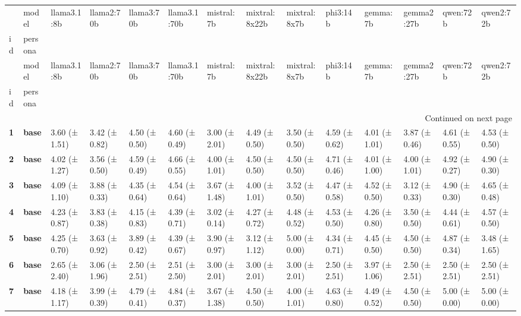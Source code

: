 \begin{longtable}{llllllllllllll}
\toprule
 & model & llama3.1:8b & llama2:70b & llama3:70b & llama3.1:70b & mistral:7b & mixtral:8x22b & mixtral:8x7b & phi3:14b & gemma:7b & gemma2:27b & qwen:72b & qwen2:72b \\
id & persona &  &  &  &  &  &  &  &  &  &  &  &  \\
\midrule
\endfirsthead
\toprule
 & model & llama3.1:8b & llama2:70b & llama3:70b & llama3.1:70b & mistral:7b & mixtral:8x22b & mixtral:8x7b & phi3:14b & gemma:7b & gemma2:27b & qwen:72b & qwen2:72b \\
id & persona &  &  &  &  &  &  &  &  &  &  &  &  \\
\midrule
\endhead
\midrule
\multicolumn{14}{r}{Continued on next page} \\
\midrule
\endfoot
\bottomrule
\endlastfoot
\textbf{1} & \textbf{base} & 3.60 (± 1.51) & 3.42 (± 0.82) & 4.50 (± 0.50) & 4.60 (± 0.49) & 3.00 (± 2.01) & 4.49 (± 0.50) & 3.50 (± 0.50) & 4.59 (± 0.62) & 4.01 (± 1.01) & 3.87 (± 0.46) & 4.61 (± 0.55) & 4.53 (± 0.50) \\
\cline{1-14}
\textbf{2} & \textbf{base} & 4.02 (± 1.27) & 3.56 (± 0.50) & 4.59 (± 0.49) & 4.66 (± 0.55) & 4.00 (± 1.01) & 4.50 (± 0.50) & 4.50 (± 0.50) & 4.71 (± 0.46) & 4.01 (± 1.00) & 4.00 (± 1.01) & 4.92 (± 0.27) & 4.90 (± 0.30) \\
\cline{1-14}
\textbf{3} & \textbf{base} & 4.09 (± 1.10) & 3.88 (± 0.33) & 4.35 (± 0.64) & 4.54 (± 0.64) & 3.67 (± 1.48) & 4.00 (± 1.01) & 3.52 (± 0.50) & 4.47 (± 0.58) & 4.52 (± 0.50) & 3.12 (± 0.33) & 4.90 (± 0.30) & 4.65 (± 0.48) \\
\cline{1-14}
\textbf{4} & \textbf{base} & 4.23 (± 0.87) & 3.83 (± 0.38) & 4.15 (± 0.83) & 4.39 (± 0.71) & 3.02 (± 0.14) & 4.27 (± 0.72) & 4.48 (± 0.52) & 4.53 (± 0.50) & 4.26 (± 0.80) & 3.50 (± 0.50) & 4.44 (± 0.61) & 4.57 (± 0.50) \\
\cline{1-14}
\textbf{5} & \textbf{base} & 4.25 (± 0.70) & 3.63 (± 0.92) & 3.89 (± 0.42) & 4.39 (± 0.67) & 3.90 (± 0.97) & 3.12 (± 1.12) & 5.00 (± 0.00) & 4.34 (± 0.71) & 4.45 (± 0.50) & 4.50 (± 0.50) & 4.87 (± 0.34) & 3.48 (± 1.65) \\
\cline{1-14}
\textbf{6} & \textbf{base} & 2.65 (± 2.40) & 3.06 (± 1.96) & 2.50 (± 2.51) & 2.51 (± 2.50) & 3.00 (± 2.01) & 3.00 (± 2.01) & 3.00 (± 2.01) & 2.50 (± 2.51) & 3.97 (± 1.06) & 2.50 (± 2.51) & 2.50 (± 2.51) & 2.50 (± 2.51) \\
\cline{1-14}
\textbf{7} & \textbf{base} & 4.18 (± 1.17) & 3.99 (± 0.39) & 4.79 (± 0.41) & 4.84 (± 0.37) & 3.67 (± 1.38) & 4.50 (± 0.50) & 4.00 (± 1.01) & 4.63 (± 0.80) & 4.49 (± 0.52) & 4.50 (± 0.50) & 5.00 (± 0.00) & 5.00 (± 0.00) \\

\end{longtable}

